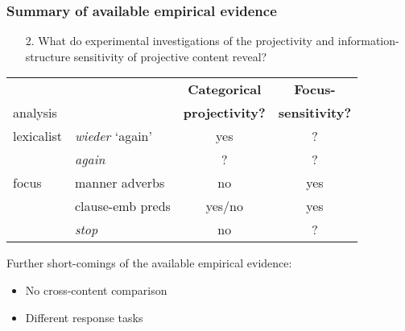 \documentclass[pdf,xcolor=table,envcountsect,handout]{beamer}
\begin{document}
\begin{frame}
\frametitle{Summary of available empirical evidence}

\begin{itemize}
\item[2.] What do experimental investigations of the projectivity and information-structure sensitivity of projective content reveal?
\end{itemize}

\bigskip

\begin{tabular}{l l | c c} 

& & {\bf Categorical} & {\bf Focus-} \\[-.1cm] 
analysis & & {\bf projectivity?} & {\bf sensitivity?} \\\hline\hline

lexicalist & {\em wieder} `again' & yes & \color{amber}?\color{black} \\

& {\em again} & \color{amber}?\color{black} & \color{amber}?\color{black} \\

\hline
\pause


focus & manner adverbs & no & yes \\

\hline
\pause

& clause-emb preds & yes/no & yes \\

& {\em stop} & no & \color{amber}?\color{black} \\


\hline
\end{tabular}

\pause

\vspace*{.5cm}

Further short-comings of the available empirical evidence:

\begin{itemize}[topsep=-10pt,leftmargin=5ex]

\item No cross-content comparison

\item Different response tasks 

\end{itemize}

\end{frame}
\end{document}

